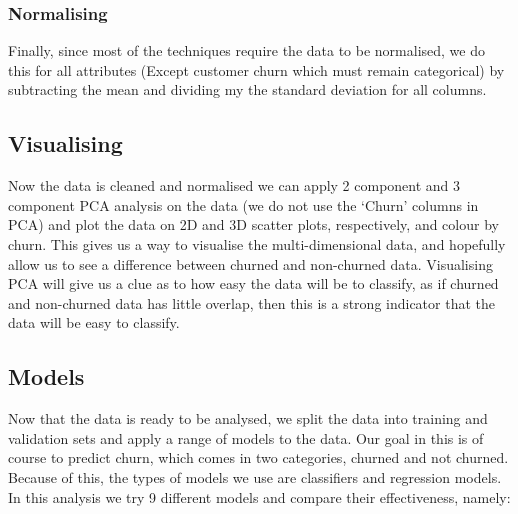 \documentclass[]{article}
\begin{document}
\subsubsection{Normalising}

Finally, since most of the techniques require the data to be normalised, we do this for all attributes (Except customer churn which must remain categorical) by subtracting the mean and dividing my the standard deviation for all columns.

\subsection{Visualising}

Now the data is cleaned and normalised we can apply 2 component and 3 component PCA analysis on the data (we do not use the ‘Churn’ columns in PCA) and plot the data on 2D and 3D scatter plots, respectively, and colour by churn. This gives us a way to visualise the multi-dimensional data, and hopefully allow us to see a difference between churned and non-churned data. Visualising PCA will give us a clue as to how easy the data will be to classify, as if churned and non-churned data has little overlap, then this is a strong indicator that the data will be easy to classify.

\subsection{Models}

Now that the data is ready to be analysed, we split the data into training and validation sets and apply a range of models to the data. Our goal in this is of course to predict churn, which comes in two categories, churned and not churned. Because of this, the types of models we use are classifiers and regression models. In this analysis we try 9 different models and compare their effectiveness, namely:
\end{document}

